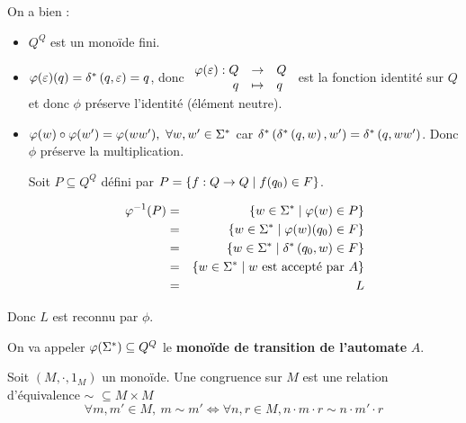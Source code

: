 \begin{proofI}
\begin{itemize}
		      On a bien :
		      \begin{itemize}
			      \item $Q^Q$ est un monoïde fini.
			      \item $\varphi (\varepsilon) (q) = \delta^{*} \left(q,\varepsilon\right) = q$, donc $\begin{array}{rcl}
					            \varphi (\varepsilon) : Q & \to     & Q \\
					            q                   & \mapsto & q
				            \end{array} $
			            est la fonction identité sur $Q$ et donc $\phi$ préserve l'identité (élément neutre).
			      \item $\varphi (w) \circ \varphi (w') = \varphi (ww'), \ \forall w, w' \in \Sigma^{*}$ car
			            $\delta^{*} \left(\delta^{*} \left(q,w\right),w'\right) = \delta^{*} \left(q,ww'\right)$.
			            Donc $\phi$ préserve la multiplication.


			            Soit $P \subseteq Q^Q$ défini par $P = \left\{f : Q \to Q \mid f(q_0)\in F\right\}$.

			            \begin{eqnarray*}
				            \varphi^{-1} (P) &=& \left\{w \in \Sigma^{*} \mid \varphi (w) \in P\right\} \\
				            &=& \left\{w \in \Sigma^{*} \mid \varphi (w) (q_0)\in F\right\} \\
				            &=& \left\{w \in \Sigma^{*} \mid \delta^{*} \left(q_0,w\right) \in F\right\}\\
				            &=& \left\{w \in \Sigma^{*} \mid w \text { est accepté par } A\right\}\\
				            &=& L
			            \end{eqnarray*}
		      \end{itemize}

		      Donc $L$ est reconnu par $\phi$.
	\end{itemize}
\end{proofI}

\begin{definition}
	On va appeler $\varphi (\Sigma^{*})\subseteq Q^Q$ le \textbf{monoïde de transition de l'automate} $A$.
\end{definition}


\begin{definition}[Congruence]
	Soit $(M, \cdot, 1_M)$ un monoïde. Une congruence sur $M$ est une relation d'équivalence $\sim$ $\subseteq M \times M$ \tlq
	$$\forall m,m'\in M, \ m \sim m' \iff \forall n,r \in M, n\cdot m \cdot r \sim n \cdot m' \cdot r$$
\end{definition}


